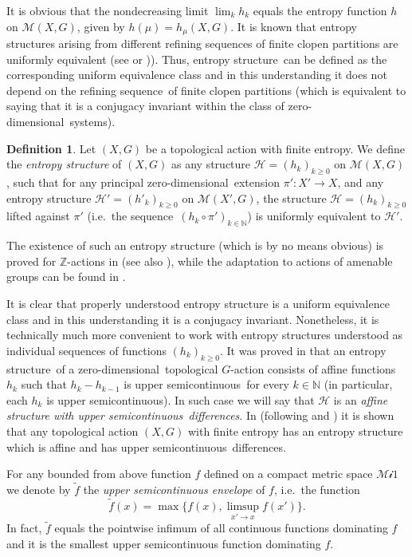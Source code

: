 \documentclass[12pt]{amsart}
\theoremstyle{definition}
\newtheorem{definition}[theorem]{Definition}
\numberwithin{equation}{section}
\def \N {\mathbb N}
\def \Z {\mathbb Z}
\def \H {\mathcal H}
\def \M {\mathcal M}
\def \sq {sequence}
\def \usc {upper semicontinuous}
\def \ens {entropy structure}
\def \zd {zero-dimen\-sio\-nal}
\def \N {\mathbb N}
\def \Z {\mathbb Z}
\def \H {\mathcal H}
\def \M {\mathcal M}
\def \sq {sequence}
\def \usc {upper semicontinuous}
\def \ens {entropy structure}
\begin{document}
It is obvious that the nondecreasing limit $\lim_{k}h_k$ equals the entropy function $h$ on $\M(X,G)$, given by $h(\mu)=h_\mu(X,G)$. It is known that \ens s arising from different refining \sq s of finite clopen partitions are uniformly equivalent (see \cite{BD} or \cite{D2005})). Thus, \ens\ can be defined as the corresponding uniform equivalence class and in this understanding it does not depend on the refining \sq\ of finite clopen partitions (which is equivalent to saying that it is a conjugacy invariant within the class of \zd\ systems).

\begin{definition}\label{ensf}
	Let $(X,G)$ be a topological action with finite entropy. We define the \emph{\ens} of $(X,G)$ as any structure $\H=(h_k)_{k\ge 0}$ on $\M(X,G)$, such that for any principal \zd\ extension $\pi':X'\to X$, and any entropy structure $\H'=(h'_k)_{k\ge 0}$ on $\M(X',G)$, the structure $\H=(h_k)_{k\ge 0}$ lifted against $\pi'$ (i.e.\ the \sq\ $(h_k\circ\pi')_{k\in\N}$) is uniformly equivalent to $\H'$.
\end{definition}

The existence of such an entropy structure (which is by no means obvious) is proved for $\Z$-actions in \cite{BD} (see also \cite{D2005}), while the adaptation to actions of amenable groups can be found in \cite{DownarowiczZhang}. 

It is clear that properly understood entropy structure is a uniform equivalence class and in this understanding it is a conjugacy invariant. Nonetheless, it is technically much more convenient to work with entropy structures understood as individual \sq s of functions $(h_k)_{k\ge 0}$. 
It was proved in \cite{DownarowiczZhang} that an \ens\ of a \zd\ topological $G$-action consists of affine functions $h_k$ such that $h_k-h_{k-1}$ is \usc\ for every $k\in\N$ (in particular, each $h_k$ is \usc). In such case we will say that $\H$ is an \emph{affine structure with \usc\ differences}. In \cite{DownarowiczZhang} (following \cite{BD} and \cite{D2005}) it is shown that any topological action $(X, G)$ with finite entropy has an entropy structure which is affine and has \usc\ differences.

For any bounded from above function $f$ defined on a compact metric space $\mathcal{Mi1}$ we denote by $\tilde{f}$ the \emph{upper semicontinuous envelope} of $f$, i.e.\ the function
$$
\tilde{f} (x) = \max \{f (x), \limsup\limits_{x'\rightarrow x} f (x')\}.
$$
In fact, $\tilde{f}$ equals the pointwise infimum of all continuous functions dominating $f$ and it is the smallest upper semicontinuous function dominating $f$.
\end{document}
